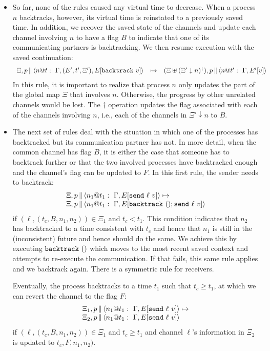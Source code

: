 \documentclass{article}
\begin{document}
\begin{itemize}
\item So far, none of the rules caused any virtual time to decrease. When a
  process $n$ backtracks, however, its virtual time is reinstated to a
  previously saved time. In addition, we recover the saved state of the
  channels and update each channel involving $n$ to have a flag $B$ to
  indicate that one of its communicating partners is backtracking. We then
  resume execution with the saved continuation:
\[\begin{array}{rcl}
  \Xi,\parc{p}{\proc{n}{\Gamma,(E',t',\Xi')}{E[\backtrack{v}]}{t}} 
  &\mapsto& 
  (\Xi\uplus(\Xi'\downarrow n)^\dagger),\parc{p}{\proc{n}{\Gamma}{E'[v]}{t'}} 
\end{array}\]
In this rule, it is important to realize that process $n$ only updates the
part of the global map $\Xi$ that involves $n$. Otherwise, the progress by
other unrelated channels would be lost. The $\dagger$ operation updates the
flag associated with each of the channels involving $n$, i.e., each of the
channels in $\Xi' \downarrow n$ to $B$.

\item The next set of rules deal with the situation in which one of the
  processes has backtracked but its communication partner has not. In more
  detail, when the common channel has flag $B$, it is either the case that
  someone has to backtrack further or that the two involved processes have
  backtracked enough and the channel's flag can be updated to $F$. In this
  first rule, the sender needs to backtrack:
\[\begin{array}{l}
  \Xi,
  \parc{p}{\proc{n_1}{\Gamma}{E[\send{\ell}{v}]}{t_1}} \mapsto \\
  \Xi,
  \parc{p}{\proc{n_1}{\Gamma}{E[\backtrack{()}; \send{\ell}{v}]}{t_1}}
\end{array}\]
if $(\ell,(t_c,B,n_1,n_2)) \in \Xi_1$ and $t_c < t_1$. This condition
indicates that $n_2$ has backtracked to a time consistent with $t_c$ and
hence that $n_1$ is still in the (inconsistent) future and hence should do
the same. We achieve this by executing $\backtrack{()}$ which moves to the
most recent saved context and attempts to re-execute the communication.  If
that fails, this same rule applies and we backtrack again.  There is a
symmetric rule for receivers.

Eventually, the process backtracks to a time $t_1$ such that $t_c \geq t_1$,
at which we can revert the channel to the flag $F$:
\[\begin{array}{l}
  \Xi_1,
  \parc{p}{\proc{n_1}{\Gamma}{E[\send{\ell}{v}]}{t_1}} \mapsto \\
  \Xi_2,
  \parc{p}{\proc{n_1}{\Gamma}{E[\send{\ell}{v}]}{t_1}} 
\end{array}\]
if $(\ell,(t_c,B,n_1,n_2)) \in \Xi_1$ and $t_c \geq t_1$ and channel $\ell$'s
information in $\Xi_2$ is updated to $t_c,F,n_1,n_2)$.

\end{itemize}

\end{document}

